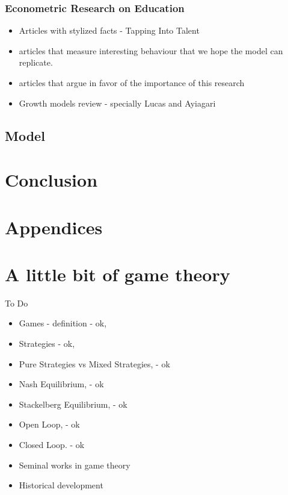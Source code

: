 \documentclass{article}
\begin{document}
\subsubsection{Econometric Research on Education}
\begin{itemize}
    \item Articles with stylized facts - Tapping Into Talent
    \item articles that measure interesting behaviour that we hope the model can replicate.
    \item articles that argue in favor of the importance of this research
    \item Growth models review - specially Lucas and Ayiagari
\end{itemize}


\subsection{Model}\label{model_proposal:proposal}





\section{Conclusion}

\appendix
{}
\section*{Appendices}
\section{A little bit of game theory}\label{appendix-game-theory}
To Do
\begin{itemize}
    \item Games - definition - ok, 
    \item Strategies - ok, 
    \item Pure Strategies vs Mixed Strategies, - ok
    \item Nash Equilibrium, - ok 
    \item Stackelberg Equilibrium,  - ok
    \item Open Loop, - ok
    \item Closed Loop. - ok
    \item Seminal works in game theory
    \item Historical development
\end{itemize}
\end{document}
